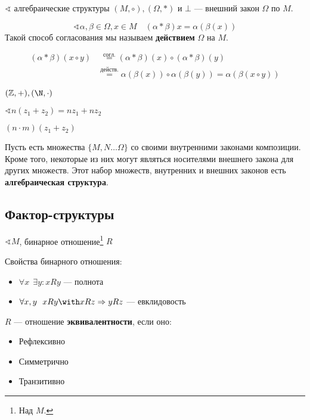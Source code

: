 \(\sphericalangle\) алгебраические структуры \((M, \circ), (\Omega, *)\) и \(\bot\) --- внешний закон \(\Omega\) по \(M\).

\begin{definition}
    \[\sphericalangle \alpha, \beta \in \Omega, x \in M \quad (\alpha * \beta) x = \alpha(\beta(x))\]
    Такой способ согласования мы называем \textbf{действием} \(\Omega\) на \(M\).
\end{definition}

\begin{align*}
    (\alpha * \beta) (x \circ y) & \,\, \stackrel{\mathrm{согл.}}{=} (\alpha * \beta)(x) \circ (\alpha * \beta)(y)                   \\
                                 & \stackrel{\mathrm{действ.}}{=} \alpha(\beta(x)) \circ \alpha(\beta(y)) = \alpha(\beta(x \circ y))
\end{align*}

\begin{example}
    \((\mathbb{Z}, +), (\N, \cdot)\)

    \(\sphericalangle n(z_1 + z_2) = nz_1 + nz_2\)

    \((n \cdot m)(z_1 + z_2)\)
\end{example}

\begin{definition}
    Пусть есть множества \(\{M, N \dots \Omega\}\) со своими внутренними законами композиции. Кроме того, некоторые из них могут являться носителями внешнего закона для других множеств. Этот набор множеств, внутренних и внешних законов есть \textbf{алгебраическая структура}.
\end{definition}

\subsection{Фактор-структуры}

\(\sphericalangle M\), бинарное отношение\footnote{Над \(M\).} \(R\)

Свойства бинарного отношения:
\begin{itemize}
    \item \(\forall x \ \ \exists y : xRy\) --- полнота
    \item \(\forall x, y \ \ x R y \with x R z \Rightarrow yRz\) --- евклидовость
\end{itemize}

\begin{definition}
    \(R\) --- отношение \textbf{эквивалентности}, если оно:
    \begin{itemize}
        \item Рефлексивно
        \item Симметрично
        \item Транзитивно
    \end{itemize}
\end{definition}

